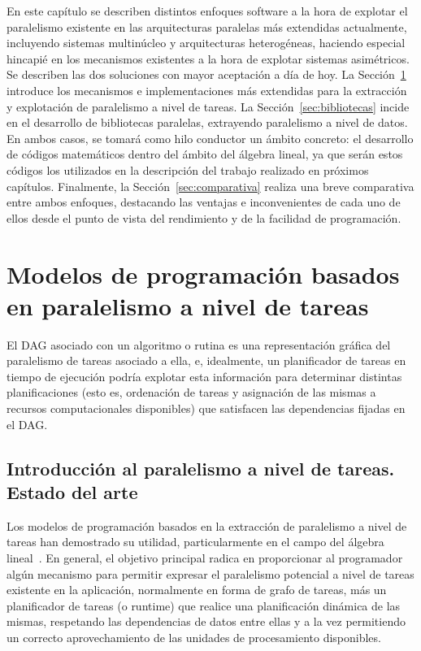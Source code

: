 En este capítulo se describen distintos enfoques software a la hora de explotar el paralelismo 
existente en las arquitecturas paralelas más extendidas actualmente, incluyendo sistemas multinúcleo y 
arquitecturas heterogéneas, haciendo especial hincapié en los mecanismos existentes a la hora de
explotar sistemas asimétricos. Se describen las dos soluciones con mayor aceptación a día de hoy. 
La Sección~\ref{sec:tareas} introduce los mecanismos e implementaciones más extendidas para la
extracción y explotación de paralelismo a nivel de tareas. 
La Sección~\ref{sec:bibliotecas} incide en el desarrollo de bibliotecas paralelas, extrayendo
paralelismo a nivel de datos.
En ambos casos, se tomará como hilo conductor un ámbito concreto: el desarrollo de códigos matemáticos
dentro del ámbito del álgebra lineal, ya que serán estos códigos los utilizados en la descripción
del trabajo realizado en próximos capítulos.
Finalmente, la Sección~\ref{sec:comparativa} realiza una breve comparativa entre ambos enfoques,
destacando las ventajas e inconvenientes de cada uno de ellos desde el punto de vista del rendimiento
y de la facilidad de programación.


\section{Modelos de programación basados en paralelismo a nivel de tareas}
\label{sec:tareas}

El DAG asociado con un algoritmo o rutina es una representación gráfica del paralelismo de tareas asociado a ella,
e, idealmente, un planificador de tareas en tiempo de ejecución podría explotar esta información para determinar
distintas planificaciones (esto es, ordenación de tareas y asignación de las mismas a recursos computacionales
disponibles) que satisfacen las dependencias fijadas en el DAG.

\subsection{Introducción al paralelismo a nivel de tareas. Estado del arte}

Los modelos de programación basados en la extracción de paralelismo a nivel de tareas han demostrado
su utilidad, particularmente en el campo del álgebra lineal~\cite{Abalenkovs}. En general, el objetivo
principal radica en proporcionar al programador algún mecanismo para permitir expresar el paralelismo
potencial a nivel de tareas existente en la aplicación, normalmente en forma de grafo de tareas, más un
planificador de tareas (o runtime) que realice una planificación dinámica de las mismas, respetando
las dependencias de datos entre ellas y a la vez permitiendo un correcto aprovechamiento
de las unidades de procesamiento disponibles.

